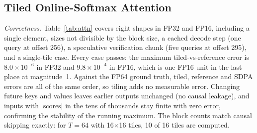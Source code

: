 \documentclass[conference]{IEEEtran}
\begin{document}
\subsection{Tiled Online-Softmax Attention}
\textit{Correctness.} Table~\ref{tab:attn} covers eight shapes in FP32 and FP16, including a single element, sizes not divisible by the block size, a cached decode step (one query at offset 256), a speculative verification chunk (five queries at offset 295), and a single-tile case. Every case passes: the maximum tiled-vs-reference error is $8.0\times10^{-6}$ in FP32 and $9.8\times10^{-4}$ in FP16, which is one FP16 unit in the last place at magnitude~1. Against the FP64 ground truth, tiled, reference and SDPA errors are all of the same order, so tiling adds no measurable error. Changing future keys and values leaves earlier outputs unchanged (no causal leakage), and inputs with $|\text{scores}|$ in the tens of thousands stay finite with zero error, confirming the stability of the running maximum. The block counts match causal skipping exactly: for $T{=}64$ with 16$\times$16 tiles, 10 of 16 tiles are computed.

\begin{table}[t]
\caption{Attention correctness (max / mean absolute error vs.\ reference)}
\label{tab:attn}
\centering
\footnotesize
\setlength{\tabcolsep}{3pt}
\end{table}
\end{document}
